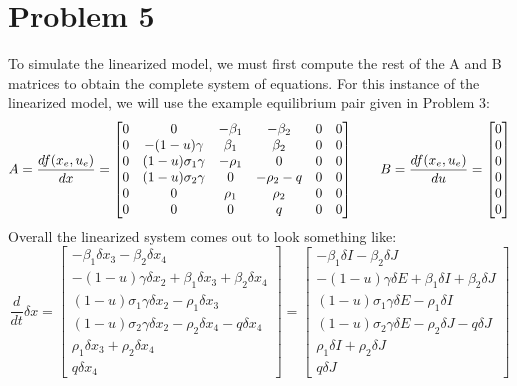 \documentclass[letterpaper,twocolumn,10pt]{article}
\begin{document}
\section*{Problem 5}
To simulate the linearized model, we must first compute the rest of the A and B matrices to obtain the complete system of equations. For this instance of the linearized model, we will use the example equilibrium pair given in Problem 3:
\begin{equation*}
A
=
\frac{df(x_{e}, u_{e})}{dx}
=
\begin{bmatrix}
0 & 0 & -\beta_{1} & -\beta_{2} & 0 & 0\\
0 & -(1 - u)\gamma & \beta_{1} & \beta_{2} & 0 & 0\\
0 & (1-u)\sigma_{1}\gamma & -\rho_{1} & 0 & 0 & 0\\
0 & (1-u)\sigma_{2}\gamma & 0 & -\rho_{2}-q & 0 & 0\\
0 & 0 & \rho_{1} & \rho_{2} & 0 & 0\\
0 & 0 & 0 & q & 0 & 0
\end{bmatrix}
\hspace{7mm}
B
=
\frac{df(x_{e}, u_{e})}{du}
=
\begin{bmatrix}
0\\
0\\
0\\
0\\
0\\
0
\end{bmatrix}
\end{equation*}
Overall the linearized system comes out to look something like:
\begin{equation*}
\frac{d}{dt}\delta x
=
\begin{bmatrix}
-\beta_{1}\delta x_{3} - \beta_{2}\delta x_{4}\\
-(1-u)\gamma\delta x_{2} + \beta_{1}\delta x_{3} + \beta_{2}\delta x_{4}\\
(1-u)\sigma_{1}\gamma\delta x_{2} - \rho_{1}\delta x_{3}\\
(1-u)\sigma_{2}\gamma\delta x_{2} -\rho_{2}\delta x_{4} - q\delta x_{4}\\
\rho_{1}\delta x_{3} + \rho_{2}\delta x_{4}\\
q\delta x_{4}
\end{bmatrix}
=
\begin{bmatrix}
-\beta_{1}\delta I - \beta_{2}\delta J\\
-(1-u)\gamma\delta E + \beta_{1}\delta I + \beta_{2}\delta J\\
(1-u)\sigma_{1}\gamma\delta E - \rho_{1}\delta I\\
(1-u)\sigma_{2}\gamma\delta E -\rho_{2}\delta J - q\delta J\\
\rho_{1}\delta I + \rho_{2}\delta J\\
q\delta J
\end{bmatrix}
\end{equation*}
\end{document}
